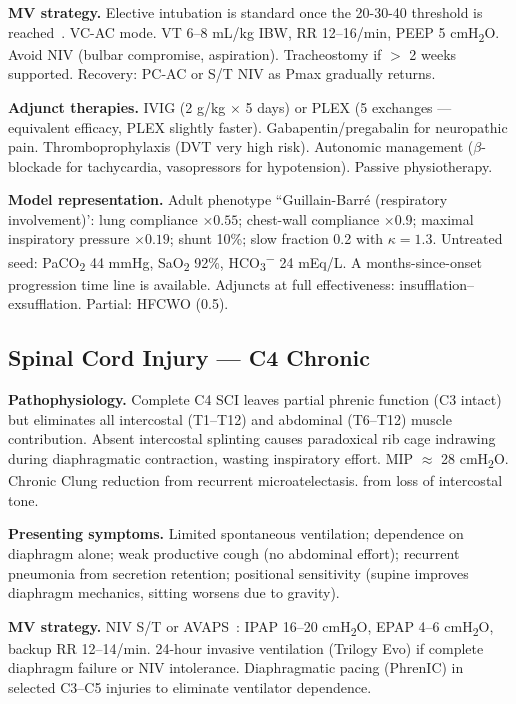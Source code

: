 \textbf{MV strategy.} Elective intubation is standard once the 20-30-40 threshold is reached~\citep{sharshar2003}. VC-AC mode. VT 6--8 mL/kg IBW, RR 12--16/min, PEEP 5 cmH\textsubscript{2}O. Avoid NIV (bulbar compromise, aspiration). Tracheostomy if $>$ 2 weeks supported. Recovery: PC-AC or S/T NIV as Pmax gradually returns.

\textbf{Adjunct therapies.} IVIG (2 g/kg $\times$ 5 days) or PLEX (5 exchanges --- equivalent efficacy, PLEX slightly faster). Gabapentin/pregabalin for neuropathic pain. Thromboprophylaxis (DVT very high risk). Autonomic management ($\beta$-blockade for tachycardia, vasopressors for hypotension). Passive physiotherapy.

\textbf{Model representation.} Adult phenotype ``Guillain-Barré (respiratory involvement)': lung compliance $\times0.55$; chest-wall compliance $\times0.9$; maximal inspiratory pressure $\times0.19$; shunt 10\%; slow fraction 0.2 with $\kappa=1.3$. Untreated seed: PaCO\textsubscript{2} 44 mmHg, SaO\textsubscript{2} 92\%, HCO\textsubscript{3}\textsuperscript{$-$} 24 mEq/L. A months-since-onset progression time line is available. Adjuncts at full effectiveness: insufflation--exsufflation. Partial: HFCWO (0.5).

\subsection{Spinal Cord Injury --- C4 Chronic}
\textbf{Pathophysiology.} Complete C4 SCI leaves partial phrenic function (C3 intact) but eliminates all intercostal (T1--T12) and abdominal (T6--T12) muscle contribution. Absent intercostal splinting causes paradoxical rib cage indrawing during diaphragmatic contraction, wasting inspiratory effort. MIP $\approx$ 28 cmH\textsubscript{2}O. Chronic Clung reduction from recurrent microatelectasis. from loss of intercostal tone.

\textbf{Presenting symptoms.} Limited spontaneous ventilation; dependence on diaphragm alone; weak productive cough (no abdominal effort); recurrent pneumonia from secretion retention; positional sensitivity (supine improves diaphragm mechanics, sitting worsens due to gravity).

\textbf{MV strategy.} NIV S/T or AVAPS~\citep{brown2006}: IPAP 16--20 cmH\textsubscript{2}O, EPAP 4--6 cmH\textsubscript{2}O, backup RR 12--14/min. 24-hour invasive ventilation (Trilogy Evo) if complete diaphragm failure or NIV intolerance. Diaphragmatic pacing (PhrenIC) in selected C3--C5 injuries to eliminate ventilator dependence.

